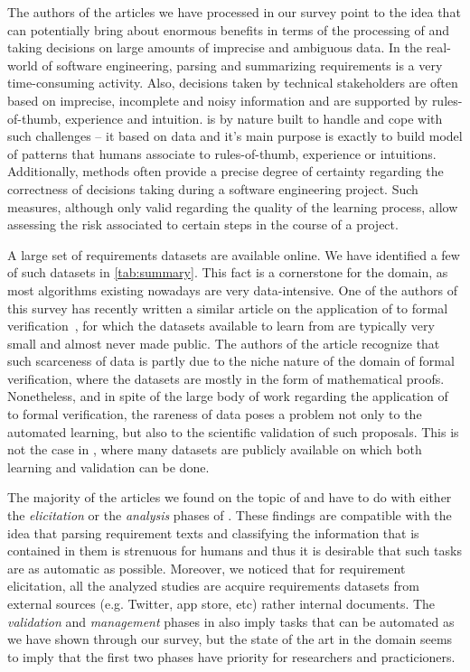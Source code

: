 The authors of the articles we have processed in our survey point to the idea
that \ML can potentially bring about enormous benefits in terms of the
processing of and taking decisions on large amounts of imprecise and ambiguous
data. In the real-world of software engineering, parsing and summarizing requirements is
a very time-consuming activity. Also, decisions taken by technical stakeholders
are often based on imprecise, incomplete and noisy information and are supported
by rules-of-thumb, experience and intuition. \ML is by nature built to handle
and cope with such challenges -- it based on data and it's main purpose is
exactly to build model of patterns that humans associate to rules-of-thumb,
experience or intuitions. Additionally, \ML methods often provide a precise
degree of certainty regarding the correctness of decisions taking during a
software engineering project. Such measures, although only valid regarding the
quality of the learning process, allow assessing the risk associated to certain
steps in the course of a project.

A large set of requirements datasets are available online. We have
identified a few of such datasets in \tab \ref{tab:summary}. This fact is a cornerstone for the domain, as most \ML
algorithms existing nowadays are very data-intensive. One of the authors of this
survey has recently written a similar article on the application of \ML to
formal verification~\cite{AmLuBi:2018}, for which the datasets available
to learn from are typically very small and almost never made public. The authors
of the article recognize that such scarceness of data is partly due to the niche
nature of the domain of formal verification, where the datasets are mostly in
the form of mathematical proofs. Nonetheless, and in spite of the large body of
work regarding the application of \ML to formal verification, the rareness of
data poses a problem not only to the automated learning, but also to the
scientific validation of such proposals. This is not the case in \RE, where many
datasets are publicly available on which both learning and validation can be
done.

The majority of the articles we found on the topic of \ML and \RE have to do
with either the \emph{elicitation} or the \emph{analysis} phases of \RE. These
findings are compatible with the idea that parsing requirement texts and
classifying the information that is contained in them is strenuous for humans
and thus it is desirable that such tasks are as automatic as possible. Moreover,
we noticed that for requirement elicitation, all the analyzed studies are
acquire requirements datasets from external sources (e.g. Twitter, app store,
etc) rather internal documents. The \emph{validation} and \emph{management}
phases in \RE also imply tasks that can be automated as we have shown through our survey,
but the state of the art in the domain seems to imply that the first two phases
have priority for researchers and practicioners.

